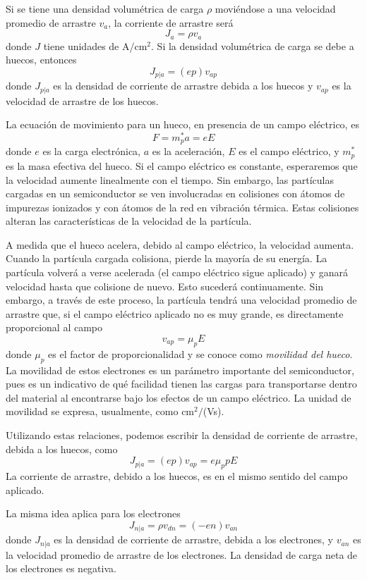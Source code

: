 \documentclass[12pt,a4paper]{article}
\begin{document}
Si se tiene una densidad volumétrica de carga $\rho$ moviéndose a una velocidad promedio de arrastre $v_{a}$, la corriente de arrastre será
\[ J_{a}= \rho v_{a} \]
donde $J$ tiene unidades de A/cm$^{2}$. Si la densidad volumétrica de carga se debe a huecos, entonces
\[ J_{p|a} = (ep)v_{ap} \]
donde $J_{p|a}$ es la densidad de corriente de arrastre debida a los huecos y $v_{ap}$ es la velocidad de arrastre de los huecos.

La ecuación de movimiento para un hueco, en presencia de un campo eléctrico, es
\[ F=m_{p}^{\ast}a=eE \]
donde $e$ es la carga electrónica, $a$ es la aceleración, $E$ es el campo eléctrico, y $m_{p}^{\ast}$ es la masa efectiva del hueco. Si el campo eléctrico es constante, esperaremos que la velocidad aumente linealmente con el tiempo. Sin embargo, las partículas cargadas en un semiconductor se ven involucradas en colisiones con átomos de impurezas ionizados y con átomos de la red en vibración térmica. Estas colisiones alteran las características de la velocidad de la partícula.

A medida que el hueco acelera, debido al campo eléctrico, la velocidad aumenta. Cuando la partícula cargada colisiona, pierde la mayoría de su energía. La partícula volverá a verse acelerada (el campo eléctrico sigue aplicado) y ganará velocidad hasta que colisione de nuevo. Esto sucederá continuamente. Sin embargo, a través de este proceso, la partícula tendrá una velocidad promedio de arrastre que, si el campo eléctrico aplicado no es muy grande, es directamente proporcional al campo
\[ v_{ap} = \mu _{p} E \]
donde $\mu _{p}$ es el factor de proporcionalidad y se conoce como \emph{movilidad del hueco}. La movilidad de estos electrones es un parámetro importante del semiconductor, pues es un indicativo de qué facilidad tienen las cargas para transportarse dentro del material al encontrarse bajo los efectos de un campo eléctrico. La unidad de movilidad se expresa, usualmente, como cm$^{2}/$(Vs).

Utilizando estas relaciones, podemos escribir la densidad de corriente de arrastre, debida a los huecos, como
\[ J_{p|a}= (ep)v_{ap} = e \mu _{p} p E \]
La corriente de arrastre, debido a los huecos, es en el mismo sentido del campo aplicado.

La misma idea aplica para los electrones
\[ J_{n|a} = \rho v_{dn} = (-en)v_{an} \]
donde $J_{n|a}$ es la densidad de corriente de arrastre, debida a los electrones, y $v_{an}$ es la velocidad promedio de arrastre de los electrones. La densidad de carga neta de los electrones es negativa.
\end{document}
